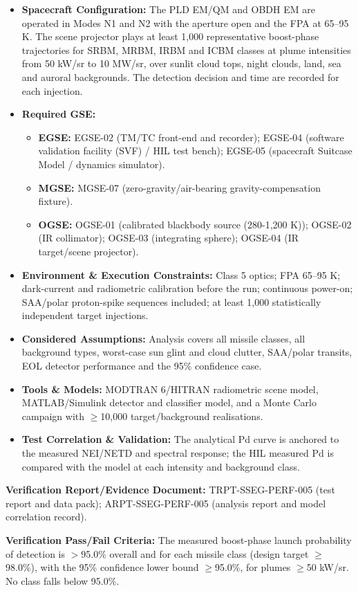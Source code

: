 \begin{itemize}
\item \textbf{Spacecraft Configuration:} The PLD EM/QM and OBDH EM are operated in Modes N1 and N2 with the aperture open and the FPA at 65--95 K. The scene projector plays at least 1,000 representative boost-phase trajectories for SRBM, MRBM, IRBM and ICBM classes at plume intensities from 50 kW/sr to 10 MW/sr, over sunlit cloud tops, night clouds, land, sea and auroral backgrounds. The detection decision and time are recorded for each injection.
\item \textbf{Required GSE:}
\begin{itemize}
\item \textbf{EGSE:} EGSE-02 (TM/TC front-end and recorder); EGSE-04 (software validation facility (SVF) / HIL test bench); EGSE-05 (spacecraft Suitcase Model / dynamics simulator).
\item \textbf{MGSE:} MGSE-07 (zero-gravity/air-bearing gravity-compensation fixture).
\item \textbf{OGSE:} OGSE-01 (calibrated blackbody source (280-1,200 K)); OGSE-02 (IR collimator); OGSE-03 (integrating sphere); OGSE-04 (IR target/scene projector).
\end{itemize}
\item \textbf{Environment \& Execution Constraints:} Class 5 optics; FPA 65--95 K; dark-current and radiometric calibration before the run; continuous power-on; SAA/polar proton-spike sequences included; at least 1,000 statistically independent target injections.
\item \textbf{Considered Assumptions:} Analysis covers all missile classes, all background types, worst-case sun glint and cloud clutter, SAA/polar transits, EOL detector performance and the 95\% confidence case.
\item \textbf{Tools \& Models:} MODTRAN 6/HITRAN radiometric scene model, MATLAB/Simulink detector and classifier model, and a Monte Carlo campaign with $\ge$10,000 target/background realisations.
\item \textbf{Test Correlation \& Validation:} The analytical Pd curve is anchored to the measured NEI/NETD and spectral response; the HIL measured Pd is compared with the model at each intensity and background class.
\end{itemize}
\par\textbf{Verification Report/Evidence Document:} TRPT-SSEG-PERF-005 (test report and data pack); ARPT-SSEG-PERF-005 (analysis report and model correlation record).
\par\textbf{Verification Pass/Fail Criteria:} The measured boost-phase launch probability of detection is $>$95.0\% overall and for each missile class (design target $\ge$98.0\%), with the 95\% confidence lower bound $\ge$95.0\%, for plumes $\ge$50 kW/sr. No class falls below 95.0\%.
\par\medskip

